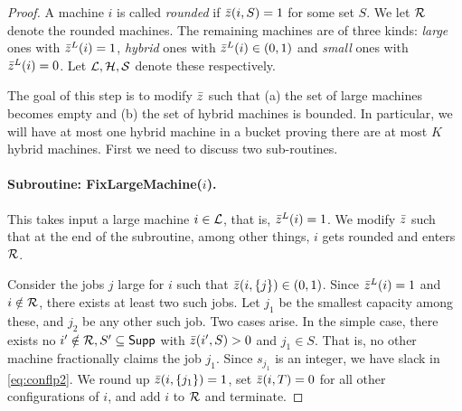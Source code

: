\begin{proof}
A machine $i$ is called {\em rounded} if $\bar z(i,S) = 1$ for some set $S$. We let ${\cal R}$ denote the rounded machines.
The remaining machines are of three kinds:  {\em large} ones with $\bar z^L(i) = 1$, {\em hybrid} ones with $\bar z^L(i) \in (0,1)$ and {\em small} ones with $\bar z^L(i) = 0$. 
Let ${\cal L},{\cal H},{\cal S}$ denote these respectively.  \medskip

   

The goal of this step is to modify $\bar z$ such that (a) the set of large machines becomes empty and (b) the set of hybrid machines is bounded. In particular, we will have at most one hybrid machine in a bucket 
proving there are at most $K$ hybrid machines. First we need to discuss two sub-routines.

\paragraph{Subroutine: {\sf FixLargeMachine}($i$).}
This takes input a large machine $i\in{\cal L}$, that is,  $\bar z^L(i) = 1$. We modify $\bar z$ such that at the end of the subroutine, among other things, $i$ gets rounded and enters ${\cal R}$.

Consider the jobs $j$ large for $i$ such that $\bar z(i,\{j\}) \in (0,1)$. Since $\bar z^L(i) = 1$ and $i\notin {\cal R}$, there exists at least two such jobs.
%
Let $j_1$ be the smallest capacity among these, and $j_2$  be any other such job. %
Two cases arise. In the simple case, there exists no $i'\notin {\cal R}, S'\subseteq \mathsf{Supp}$ with $\bar z(i',S) > 0$ and $j_1 \in S$. That is, no other machine fractionally claims the job $j_1$.
Since $s_{j_1}$ is an integer, we have slack in \eqref{eq:conflp2}. We round up $\bar z(i,\{j_1\}) = 1$, set $\bar z(i,T) = 0$ for all other configurations of $i$, and add $i$ to ${\cal R}$ and terminate.
%


\end{proof}
